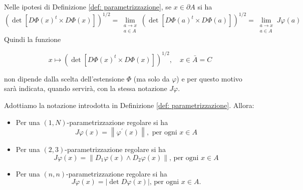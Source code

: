 \begin{oss}
    Nelle ipotesi di Definizione \ref{def: parametrizzazione}, se $x \in \partial A$ si ha
    \[
    \left(\operatorname{det}\left[D \Phi(x)^{t} \times D \Phi(x)\right]\right)^{1 / 2}=\lim _{\substack{a \rightarrow x \\ a \in A}}\left(\operatorname{det}\left[D \Phi(a)^{t} \times D \Phi(a)\right]\right)^{1 / 2}=\lim _{\substack{a \rightarrow x \\ a \in A}} J \varphi(a)
    \]
    Quindi la funzione

    \[
    x \mapsto\left(\operatorname{det}\left[D \Phi(x)^{t} \times D \Phi(x)\right]\right)^{1 / 2}, \quad x \in \bar{A}=C
    \]

    non dipende dalla scelta dell'estensione $\Phi$ (ma solo da $\varphi$) e per questo motivo sarà indicata, quando servirà, con la stessa notazione $J \varphi$.
\end{oss}

\begin{oss}\label{oss: 2.16}
    Adottiamo la notazione introdotta in Definizione \ref{def: parametrizzazione}. Allora:

\begin{itemize}
    \item Per una $(1, N)$-parametrizzazione regolare si ha
    \[J \varphi(x)=\left\|\varphi^{\prime}(x)\right\|, \text { per ogni } x \in A\]
    \item Per una $(2,3)$-parametrizzazione regolare si ha
    \[J \varphi(x)=\left\|D_{1} \varphi(x) \wedge D_{2} \varphi(x)\right\| \text {, per ogni } x \in A\]
    \item Per una $(n, n)$-parametrizzazione regolare si ha
    \[J \varphi(x)=|\operatorname{det} D \varphi(x)| \text {, per ogni } x \in A.\]
\end{itemize}
\end{oss}


